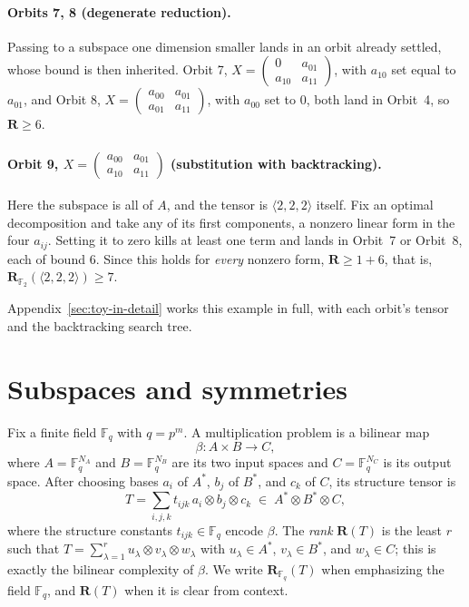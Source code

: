 \documentclass[11pt]{article}
\theoremstyle{definition}
\newcommand{\F}{\mathbb{F}}
\newcommand{\R}{\mathbf{R}}
\newcommand{\Rk}[2]{\mathbf{R}_{#1}(#2)}
\newcommand{\mmt}[3]{\langle #1,#2,#3\rangle}
\begin{document}
\paragraph{Orbits 7, 8 (degenerate reduction).} Passing to a subspace one dimension
smaller lands in an orbit already settled, whose bound is then inherited. Orbit 7,
$X=\left(
  \begin{smallmatrix}0&a_{01}\\a_{10}&a_{11}
\end{smallmatrix}\right)$, with $a_{10}$
set equal to $a_{01}$, and Orbit 8, $X=\left(
  \begin{smallmatrix}a_{00}&a_{01}\\a_{01}&a_{11}
\end{smallmatrix}\right)$, with
$a_{00}$ set to $0$, both land in Orbit~4, so $\R\ge 6$.

\paragraph{Orbit 9, $X=\left(
    \begin{smallmatrix}a_{00}&a_{01}\\a_{10}&a_{11}
\end{smallmatrix}\right)$ (substitution with backtracking).}
Here the subspace is all of $A$, and the tensor is $\mmt{2}{2}{2}$ itself. Fix an optimal decomposition
and take any of its first components, a nonzero linear form in the four $a_{ij}$.
Setting it to zero kills at least one term and lands in Orbit~7 or Orbit~8, each of
bound $6$. Since this holds for \emph{every} nonzero form, $\R\ge 1+6$, that is,
$ \Rk{\F_2}{\mmt{2}{2}{2}}\ge 7$.

Appendix~\ref{sec:toy-in-detail} works this example in full, with each orbit's
tensor and the backtracking search tree.

\section{Subspaces and symmetries}\label{sec:framework}

Fix a finite field $\F_q$ with $q=p^m$. A multiplication problem is a bilinear
map
\[
  \beta\colon A\times B\longrightarrow C,
\]
where $A=\F_q^{N_A}$ and $B=\F_q^{N_B}$ are its two input spaces and
$C=\F_q^{N_C}$ is its output space. After choosing bases $a_i$ of $A^*$,
$b_j$ of $B^*$, and $c_k$ of $C$, its structure tensor is
\[
  T = \sum_{i,j,k} t_{ijk}\, a_i \otimes b_j \otimes c_k
  \;\in\; A^* \otimes B^* \otimes C,
\]
where the structure constants $t_{ijk}\in\F_q$ encode $\beta$. The \emph{rank}
$\R(T)$ is the least $r$ such that
$T=\sum_{\lambda=1}^{r} u_\lambda\otimes v_\lambda\otimes w_\lambda$ with
$u_\lambda\in A^*$, $v_\lambda\in B^*$, and $w_\lambda\in C$; this is exactly the bilinear
complexity of $\beta$. We write $\Rk{\F_q}{T}$ when emphasizing the field $\F_q$,
and $\R(T)$ when it is clear from context.
\end{document}
